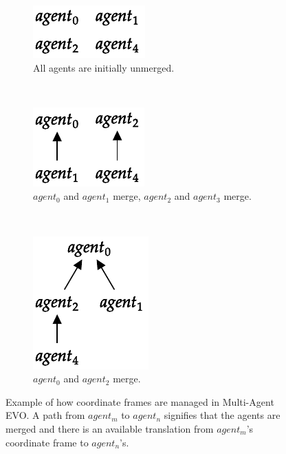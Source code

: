\begin{figure}[h]
    \centering
    \begin{subfigure}[t]{0.3\textwidth}
        \centering
        \includegraphics[width=0.4\linewidth]{figures/evo_1.pdf}
        \caption{All agents are initially unmerged.}
    \end{subfigure}%
    ~
    \begin{subfigure}[t]{0.3\textwidth}
        \centering
        \includegraphics[width=0.4\linewidth]{figures/evo_2.pdf}
        \caption{$agent_0$ and $agent_1$ merge, $agent_2$ and $agent_3$ merge.}
    \end{subfigure}%
    ~
    \begin{subfigure}[t]{0.3\textwidth}
        \centering
        \includegraphics[width=0.4\linewidth]{figures/evo_3.pdf}
        \caption{$agent_0$ and $agent_2$ merge.}
    \end{subfigure}%

    \caption{Example of how coordinate frames are managed in Multi-Agent EVO. A path from $agent_m$ to $agent_n$ signifies that the agents are merged and there is an available translation from $agent_m$'s coordinate frame to $agent_n$'s.}
    \label{fig:evo-coord-frames}
\end{figure}

